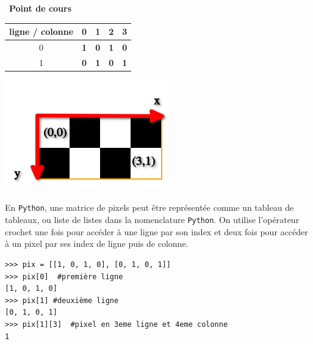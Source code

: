 \documentclass[a4paper, french, 12pt]{article}
\newcounter{cours}
\newenvironment{cours}[1]
{\par \medskip   \addtocounter{cours}{1} \noindent  
\begin{bclogo}[arrondi =0.1,  ombre = true, barre=none, logo=\bcbook, marge=4]{~\textbf{Point de cours} \textbf{\thecours} {\itshape #1} }  \par}
{
\end{bclogo}
 \par \bigskip }
\begin{document}
\begin{cours}{}
\begin{minipage}{0.4\linewidth}
\begin{center}
\begin{tabular}{|c|c|c|c|c|}
\hline 
ligne / colonne & 0 & 1 & 2 & 3 \\ 
\hline 
0 & \textbf{1} & \textbf{0} & \textbf{1} & \textbf{0} \\ 
\hline 
1 & \textbf{0} &\textbf{1} & \textbf{0} & \textbf{1} \\ 
\hline 
\end{tabular} 
\end{center}
\end{minipage}
\hfill
\begin{minipage}{0.4\linewidth}
\begin{center}
\includegraphics[scale=0.5]{images/exemple_binaire_cadre.png}
\end{center}
\end{minipage}

En \texttt{Python}, une matrice de pixels peut être représentée comme un tableau de tableaux, ou liste de listes dans la nomenclature \texttt{Python}. On utilise l'opérateur crochet une fois pour accéder à une ligne par son index et deux fois pour accéder à un pixel par ses index de ligne puis de colonne.


\begin{lstlisting}[style=rond]
>>> pix = [[1, 0, 1, 0], [0, 1, 0, 1]]
>>> pix[0]  #première ligne 
[1, 0, 1, 0]
>>> pix[1] #deuxième ligne
[0, 1, 0, 1]
>>> pix[1][3]  #pixel en 3eme ligne et 4eme colonne
1
\end{lstlisting}



\end{cours}
\end{document}

